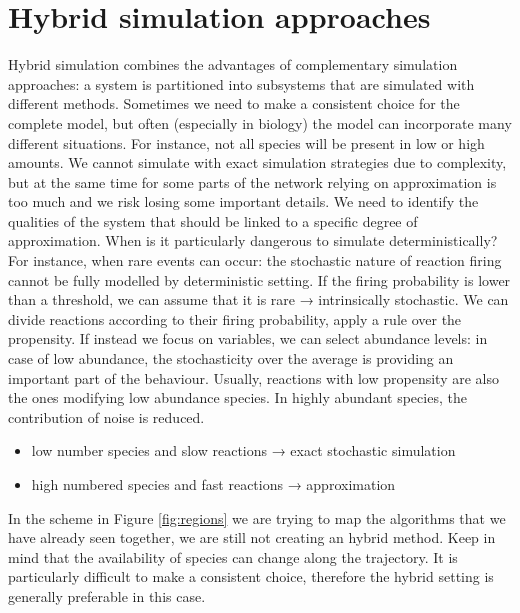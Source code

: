 \graphicspath{{chapters/06/images/}}
\chapter{Hybrid simulation approaches}
Hybrid simulation combines the advantages of complementary simulation approaches: a system is partitioned into subsystems that are simulated with different methods.
Sometimes we need to make a consistent choice for the complete model, but often (especially in biology) the model can incorporate many different situations.
For instance, not all species will be present in low or high amounts.
We cannot simulate with exact simulation strategies due to complexity, but at the same time for some parts of the network relying on approximation is too much and we risk losing some important details.
We need to identify the qualities of the system that should be linked to a specific degree of approximation.
When is it particularly dangerous to simulate deterministically? For instance, when rare events can occur: the stochastic nature of reaction firing cannot be fully modelled by deterministic setting.
If the firing probability is lower than a threshold, we can assume that it is rare → intrinsically stochastic.
We can divide reactions according to their firing probability, apply a rule over the propensity.
If instead we focus on variables, we can select abundance levels: in case of low abundance, the stochasticity over the average is providing an important part of the behaviour.
Usually, reactions with low propensity are also the ones modifying low abundance species.
In highly abundant species, the contribution of noise is reduced.

\begin{itemize}
  \item low number species and slow reactions → exact stochastic simulation
  \item high numbered species and fast reactions → approximation
\end{itemize}
\noindent
In the scheme in Figure \ref{fig:regions} we are trying to map the algorithms that we have already seen together, we are still not creating an hybrid method.
Keep in mind that the availability of species can change along the trajectory.
It is particularly difficult to make a consistent choice, therefore the hybrid setting is generally preferable in this case.

